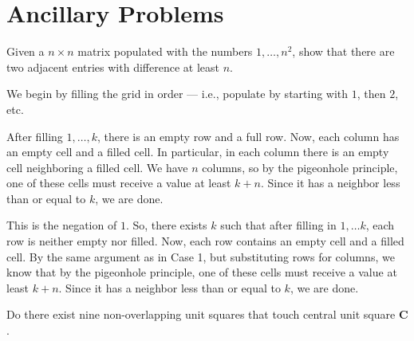 \documentclass[10pt]{mypackage}
\begin{document}
\section{Ancillary Problems}%
\begin{problem}
  Given a $n\times n$ matrix populated with the numbers $1,\dots,n^2$, show that there are two adjacent entries with difference at least $n$.
\end{problem}
\begin{solution}
  We begin by filling the grid in order --- i.e., populate by starting with $1$, then $2$, etc.
  \begin{description}[font=\normalfont\scshape,leftmargin=0pt]\itemsep=10pt
    \item[Case 1:] After filling $1,\dots,k$, there is an empty row and a full row. Now, each column has an empty cell and a filled cell. In particular, in each column there is an empty cell neighboring a filled cell. We have $n$ columns, so by the pigeonhole principle, one of these cells must receive a value at least $k+n$. Since it has a neighbor less than or equal to $k$, we are done.
    \item[Case 2:] This is the negation of $1$. So, there exists $k$ such that after filling in $1,\dots k$, each row is neither empty nor filled. Now, each row contains an empty cell and a filled cell. By the same argument as in Case 1, but substituting rows for columns, we know that by the pigeonhole principle, one of these cells must receive a value at least $k+n$. Since it has a neighbor less than or equal to $k$, we are done.
  \end{description}
\end{solution}
\begin{problem}
  Do there exist nine non-overlapping unit squares that touch central unit square $\mathbf{C}$.
\end{problem}
\end{document}
